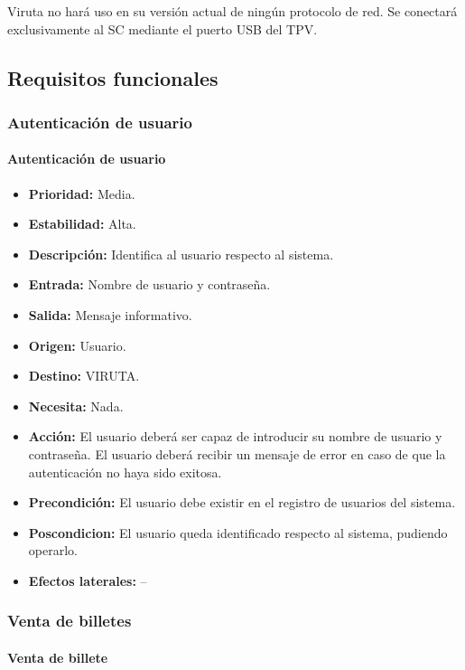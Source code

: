 Viruta no hará uso en su versión actual de ningún protocolo de red. Se conectará exclusivamente al SC mediante el puerto USB del TPV.

\subsection{Requisitos funcionales}

\subsubsection{Autenticación de usuario}

\paragraph{Autenticación de usuario}

\begin{itemize}
\item \textbf{Prioridad:} Media.
\item \textbf{Estabilidad:} Alta.
\item \textbf{Descripción:} Identifica al usuario respecto al sistema.
\item \textbf{Entrada:} Nombre de usuario y contraseña.
\item \textbf{Salida:} Mensaje informativo.
\item\textbf{ Origen:} Usuario.
\item \textbf{Destino:} VIRUTA.
\item \textbf{Necesita:} Nada.
\item \textbf{Acción:} El usuario deberá ser capaz de introducir su nombre de usuario y contraseña. El usuario deberá recibir un mensaje de error en caso de que la autenticación no haya sido exitosa.
\item \textbf{Precondición:} El usuario debe existir en el registro de usuarios del sistema.
\item \textbf{Poscondicion:} El usuario queda identificado respecto al sistema, pudiendo operarlo.
\item \textbf{Efectos laterales:} --
\end{itemize}

\subsubsection{Venta de billetes}

\paragraph{Venta de billete}

